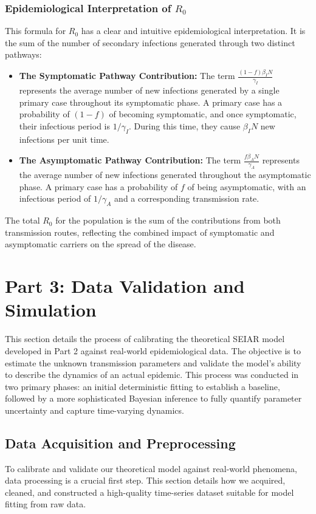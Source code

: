 \documentclass[12pt, a4paper]{article}
\begin{document}
\subsubsection{Epidemiological Interpretation of $R_0$}
This formula for $R_0$ has a clear and intuitive epidemiological interpretation. It is the sum of the number of secondary infections generated through two distinct pathways:
\begin{itemize}
    \item \textbf{The Symptomatic Pathway Contribution:} The term $\frac{(1-f)\beta_I N}{\gamma_I}$ represents the average number of new infections generated by a single primary case throughout its symptomatic phase. A primary case has a probability of $(1-f)$ of becoming symptomatic, and once symptomatic, their infectious period is $1/\gamma_I$. During this time, they cause $\beta_I N$ new infections per unit time.
    \item \textbf{The Asymptomatic Pathway Contribution:} The term $\frac{f\beta_A N}{\gamma_A}$ represents the average number of new infections generated throughout the asymptomatic phase. A primary case has a probability of $f$ of being asymptomatic, with an infectious period of $1/\gamma_A$ and a corresponding transmission rate.
\end{itemize}
The total $R_0$ for the population is the sum of the contributions from both transmission routes, reflecting the combined impact of symptomatic and asymptomatic carriers on the spread of the disease.

\section{Part 3: Data Validation and Simulation}
This section details the process of calibrating the theoretical SEIAR model developed in Part 2 against real-world epidemiological data. The objective is to estimate the unknown transmission parameters and validate the model's ability to describe the dynamics of an actual epidemic. This process was conducted in two primary phases: an initial deterministic fitting to establish a baseline, followed by a more sophisticated Bayesian inference to fully quantify parameter uncertainty and capture time-varying dynamics.

\subsection{Data Acquisition and Preprocessing}
To calibrate and validate our theoretical model against real-world phenomena, data processing is a crucial first step. This section details how we acquired, cleaned, and constructed a high-quality time-series dataset suitable for model fitting from raw data.
\end{document}
